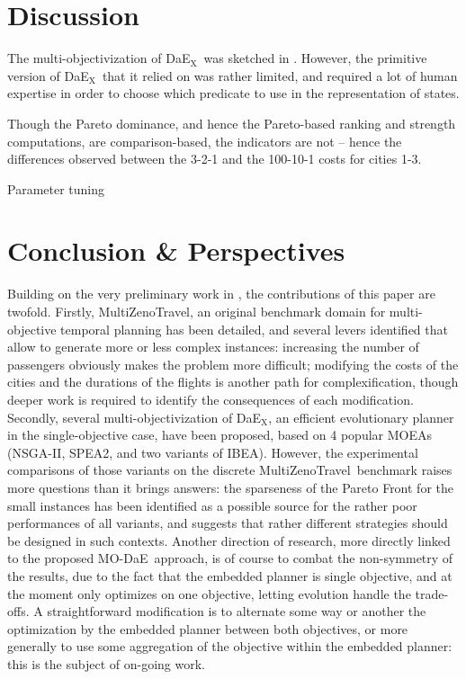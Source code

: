 \documentclass{llncs}
\def\DAEX{{\sc DaE$_{\text{X}}$}}
\def\MODAE{{\sc MO-DaE}}
\def\MULTIZENO{{\sc MultiZenoTravel}}
\begin{document}
\section{Discussion}
\label{sec:discussion}
The multi-objectivization of \DAEX\ was sketched in \cite{Schoenauer2006}. However, the primitive version of \DAEX\ that it relied on was rather limited, and required a lot of human expertise in order to choose which predicate to use in the representation of states.

Though the Pareto dominance, and hence the Pareto-based ranking and strength computations, are comparison-based, the indicators are not -- hence the differences observed between the 3-2-1 and the 100-10-1 costs for cities 1-3. 

Parameter tuning



\section{Conclusion \& Perspectives}
\label{sec:conclusion}
Building on the very preliminary work in \cite{Schoenauer2006}, the contributions of this paper are twofold. Firstly, \MULTIZENO, an original benchmark domain for multi-objective temporal planning has been detailed, and several levers identified that allow to generate more or less complex instances: increasing the number of passengers obviously makes the problem more difficult; modifying the costs of the cities and the durations of the flights is another path for complexification, though deeper work is required to identify the consequences of each modification.
Secondly, several multi-objectivization of \DAEX, an efficient evolutionary planner in the single-objective case, have been proposed, based on 4 popular MOEAs (NSGA-II, SPEA2, and two variants of IBEA).
However, the experimental comparisons of those variants on the discrete \MULTIZENO\ benchmark raises more questions than it brings answers: the sparseness of the Pareto Front for the small instances has been identified as a possible source for the rather poor performances of all variants, and suggests that rather different strategies should be designed in such contexts. Another direction of research, more directly linked to the proposed \MODAE\ approach,  is of course to combat the non-symmetry of the results, due to the fact that the embedded planner is single objective, and at the moment only optimizes on one objective, letting evolution handle the trade-offs. A straightforward modification is to alternate some way or another the optimization by the embedded planner between both objectives, or more generally to use some aggregation of the objective within the embedded planner: this is the subject of on-going work. 



\end{document}
